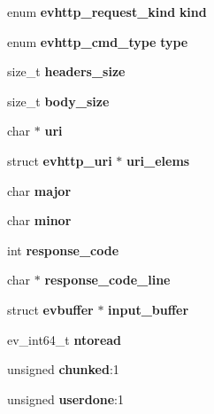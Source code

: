 \begin{DoxyCompactItemize}
\item 
enum {\bf evhttp\-\_\-request\-\_\-kind} {\bfseries kind}\label{structevhttp__request_aa53cee05790b7cffbdad794ff42919b7}

\item 
enum {\bf evhttp\-\_\-cmd\-\_\-type} {\bfseries type}\label{structevhttp__request_aa6526555032f25dd1205204b60ddd41d}

\item 
size\-\_\-t {\bfseries headers\-\_\-size}\label{structevhttp__request_a414cd4b4d35e441b98dd8605365e8b0b}

\item 
size\-\_\-t {\bfseries body\-\_\-size}\label{structevhttp__request_ae1855d81db1795c9b018b1f1767c468b}

\item 
char $\ast$ {\bfseries uri}\label{structevhttp__request_af98b83cec5342c54027dd92f7357d6e6}

\item 
struct {\bf evhttp\-\_\-uri} $\ast$ {\bfseries uri\-\_\-elems}\label{structevhttp__request_a7988edd0ffe6c65dc7c009bea57f81c9}

\item 
char {\bfseries major}\label{structevhttp__request_a5ff67cfba8dbe05179c43140cbe52b72}

\item 
char {\bfseries minor}\label{structevhttp__request_a373918edcc23e4f9efb29b0922832fe9}

\item 
int {\bfseries response\-\_\-code}\label{structevhttp__request_ab87e6ba68d41639a13e89b5a2cf400e7}

\item 
char $\ast$ {\bfseries response\-\_\-code\-\_\-line}\label{structevhttp__request_aeb8fb4f5b06ddb71a62c34075a064ff4}

\item 
struct {\bf evbuffer} $\ast$ {\bfseries input\-\_\-buffer}\label{structevhttp__request_a6563c3bec6373038d8ae9f8d17ac4bc3}

\item 
ev\-\_\-int64\-\_\-t {\bfseries ntoread}\label{structevhttp__request_a4bb14fd87ed737b58164a1489ffcdfd4}

\item 
unsigned {\bfseries chunked}\-:1\label{structevhttp__request_aef585077270a772d5e204784ef71ee85}

\item 
unsigned {\bfseries userdone}\-:1\label{structevhttp__request_a87d046996fd73792dcde0eb78446f4c8}


\end{DoxyCompactItemize}
